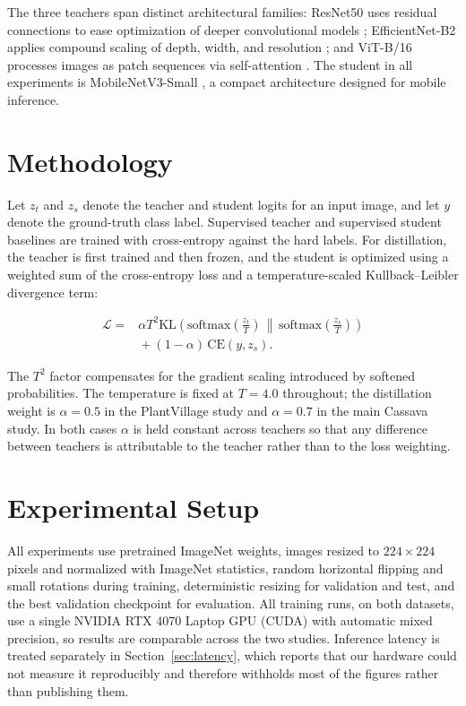\documentclass[conference]{IEEEtran}
\begin{document}
The three teachers span distinct architectural families: ResNet50 uses residual
connections to ease optimization of deeper convolutional models
\cite{he2016deep}; EfficientNet-B2 applies compound scaling of depth, width, and
resolution \cite{tan2019efficientnet}; and ViT-B/16 processes images as patch
sequences via self-attention \cite{dosovitskiy2021image}. The student in all
experiments is MobileNetV3-Small \cite{howard2019searching}, a compact
architecture designed for mobile inference.

\section{Methodology}

Let $z_t$ and $z_s$ denote the teacher and student logits for an input image,
and let $y$ denote the ground-truth class label. Supervised teacher and
supervised student baselines are trained with cross-entropy against the hard
labels. For distillation, the teacher is first trained and then frozen, and the
student is optimized using a weighted sum of the cross-entropy loss and a
temperature-scaled Kullback--Leibler divergence term:

\begin{equation}
  \begin{split}
    \mathcal{L} = {}& \alpha T^2
    \mathrm{KL}\!\left(
      \mathrm{softmax}\!\left(\frac{z_t}{T}\right)
      \,\middle\|\,
      \mathrm{softmax}\!\left(\frac{z_s}{T}\right)
    \right) \\
    &{} + (1-\alpha)\,\mathrm{CE}(y, z_s).
  \end{split}
  \label{eq:kd-loss}
\end{equation}

The $T^2$ factor compensates for the gradient scaling introduced by softened
probabilities. The temperature is fixed at $T=4.0$ throughout; the distillation
weight is $\alpha=0.5$ in the PlantVillage study and $\alpha=0.7$ in the main
Cassava study. In both cases $\alpha$ is held constant across teachers so that
any difference between teachers is attributable to the teacher rather than to
the loss weighting.

\section{Experimental Setup}
\label{sec:setup}

All experiments use pretrained ImageNet weights, images resized to
$224\times224$ pixels and normalized with ImageNet statistics, random horizontal
flipping and small rotations during training, deterministic resizing for
validation and test, and the best validation checkpoint for evaluation. All
training runs, on both datasets, use a single NVIDIA RTX 4070 Laptop GPU (CUDA) with
automatic mixed precision, so results are comparable across the two studies.
Inference latency is treated separately in Section~\ref{sec:latency}, which
reports that our hardware could not measure it reproducibly and therefore
withholds most of the figures rather than publishing them.
\end{document}
